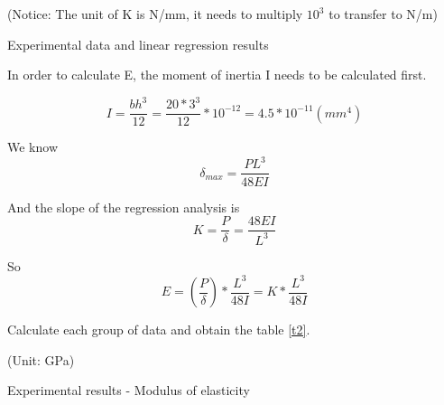\begin{minipage}[h]{\textwidth}
    \makeatletter{}
    \centering
    
    (Notice: The unit of K is N/mm, it needs to multiply $10^3$ to transfer to N/m)
    \caption{Experimental data and linear regression results}
    \label{t1} 
\end{minipage}

In order to calculate E, the moment of inertia I needs to be calculated first.

\begin{equation} 
I=\frac{bh^3}{12}=\frac{20*3^3}{12}*10^{-12}=4.5*10^{-11} (mm^4)
\end{equation}

We know 
\begin{equation} 
    \delta_{max}=\frac{PL^3}{48EI}
\end{equation}

And the slope of the regression analysis is
\begin{equation} 
    K=\frac{P}{\delta}=\frac{48EI}{L^3}
\end{equation}

So
\begin{equation} 
    E=(\frac{P}{\delta})*\frac{L^3}{48I}=K*\frac{L^3}{48I}
\end{equation}

Calculate each group of data and obtain the table \ref{t2}.

\begin{minipage}[htbp]{\textwidth}
    \makeatletter{}
    \centering
    
    (Unit: GPa)
    \caption{Experimental results - Modulus of elasticity}
    \label{t2} 
\end{minipage}


